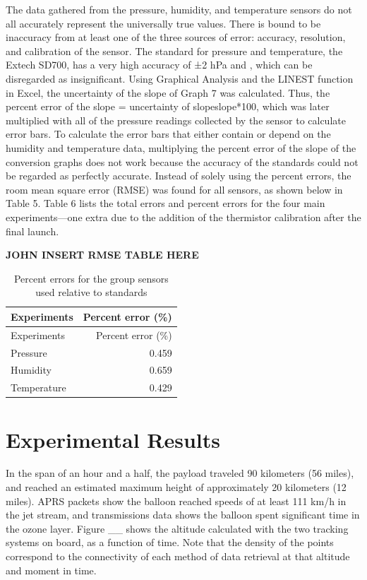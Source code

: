 \documentclass[12pt,]{article}
\begin{document}
The data gathered from the pressure, humidity, and temperature sensors
do not all accurately represent the universally true values. There is
bound to be inaccuracy from at least one of the three sources of error:
accuracy, resolution, and calibration of the sensor. The standard for
pressure and temperature, the Extech SD700, has a very high accuracy of
±2 hPa and , which can be disregarded as insignificant. Using Graphical
Analysis and the LINEST function in Excel, the uncertainty of the slope
of Graph 7 was calculated. Thus, the percent error of the slope =
uncertainty of slopeslope*100, which was later multiplied with all of
the pressure readings collected by the sensor to calculate error bars.
To calculate the error bars that either contain or depend on the
humidity and temperature data, multiplying the percent error of the
slope of the conversion graphs does not work because the accuracy of the
standards could not be regarded as perfectly accurate. Instead of solely
using the percent errors, the room mean square error (RMSE) was found
for all sensors, as shown below in Table 5. Table 6 lists the total
errors and percent errors for the four main experiments---one extra due
to the addition of the thermistor calibration after the final launch.

\textbf{JOHN INSERT RMSE TABLE HERE}

\begin{longtable}[]{@{}lr@{}}
\caption{Percent errors for the group sensors used relative to
standards}\tabularnewline
\toprule
Experiments & Percent error (\%)\tabularnewline
\midrule
\endfirsthead
\toprule
Experiments & Percent error (\%)\tabularnewline
\midrule
\endhead
Pressure & 0.459\tabularnewline
Humidity & 0.659\tabularnewline
Temperature & 0.429\tabularnewline
\bottomrule
\end{longtable}

\section{Experimental Results}\label{experimental-results}

In the span of an hour and a half, the payload traveled 90 kilometers
(56 miles), and reached an estimated maximum height of approximately 20
kilometers (12 miles). APRS packets show the balloon reached speeds of
at least 111 km/h in the jet stream, and transmissions data shows the
balloon spent significant time in the ozone layer. Figure \_\_ shows the
altitude calculated with the two tracking systems on board, as a
function of time. Note that the density of the points correspond to the
connectivity of each method of data retrieval at that altitude and
moment in time.
\end{document}

